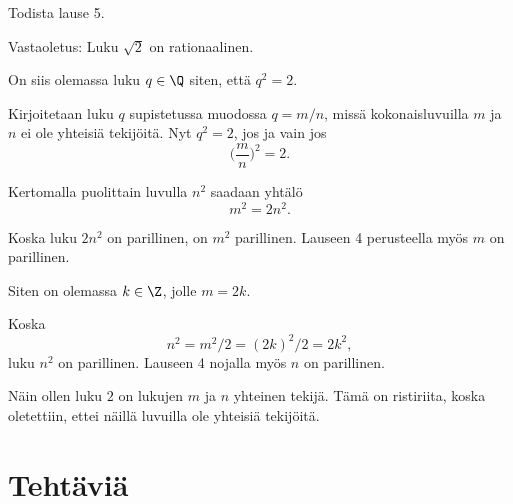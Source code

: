 \begin{esimerkki}
	Todista lause 5.

	\begin{todistus}
		Vastaoletus: Luku $\sqrt{2}$ on rationaalinen.

		On siis olemassa luku $q\in \Q$ siten, että $q^2=2$.

		Kirjoitetaan luku $q$ supistetussa muodossa $q=m/n$, missä kokonaisluvuilla
		$m$ ja $n$ ei ole yhteisiä tekijöitä. 
		Nyt $q^2=2$, jos ja vain jos
		\[
			\bigg(\frac{m}{n}\bigg)^2=2.
		\]

		Kertomalla puolittain luvulla $n^2$ saadaan yhtälö
		\[
			m^2 = 2n^2.
		\]

		Koska luku $2n^2$ on parillinen, on $m^2$ parillinen. Lauseen 4 perusteella myös $m$ on parillinen.

		Siten on olemassa $k\in \Z$, jolle $m=2k$.

		Koska
		\[
			n^2=m^2/2=(2k)^2/2= 2k^2,
		\]
		luku $n^2$ on parillinen. Lauseen 4 nojalla myös $n$ on parillinen.

		Näin ollen luku $2$ on lukujen $m$ ja $n$ yhteinen tekijä. Tämä on ristiriita,
		koska oletettiin, ettei näillä luvuilla ole yhteisiä tekijöitä.
	\end{todistus}
\end{esimerkki}

\newpage
\section*{Tehtäviä}

